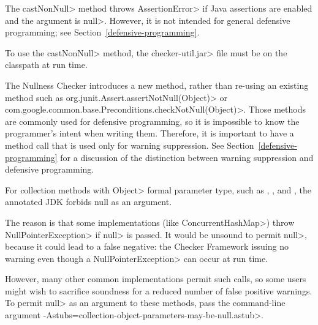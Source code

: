   The \<castNonNull> method throws \<AssertionError> if Java assertions are enabled and
  the argument is \<null>.  However, it is not intended for general defensive
  programming; see Section~\ref{defensive-programming}.

  To use the \<castNonNull> method, the \<checker-util.jar> file
  must be on the classpath at run time.

\begin{sloppypar}
The Nullness Checker introduces a new method, rather than re-using an
existing method such as \<org.junit.Assert.assertNotNull(Object)> or
\<com.google.common.base.Preconditions.checkNotNull(Object)>.  Those
methods are commonly used for defensive programming, so it is impossible to
know the programmer's intent when writing them.  Therefore, it is important to
have a method call that is used only for warning suppression.  See
Section~\ref{defensive-programming} for a discussion of
the distinction between warning suppression and defensive programming.
\end{sloppypar}



For collection methods with \<Object> formal parameter type, such as
,
, and
,
the annotated JDK forbids null as an argument.

The reason is that some implementations (like \<ConcurrentHashMap>) throw
\<NullPointerException> if \<null> is passed.  It would be unsound to
permit \<null>, because it could lead to a false negative:  the Checker
Framework issuing no warning even though a \<NullPointerException> can occur
at run time.

However, many other common implementations permit such calls, so some users
might wish to sacrifice soundness for a reduced number of false positive
warnings.  To permit \<null> as an argument to these methods, pass the
command-line argument
\<-Astubs=collection-object-parameters-may-be-null.astub>.



